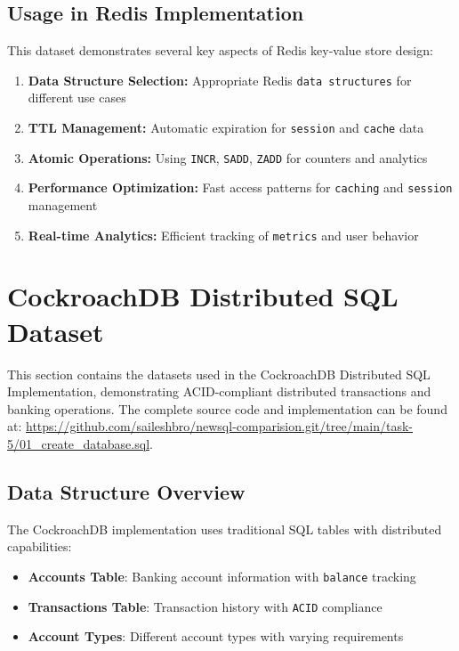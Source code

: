 \subsection{Usage in Redis Implementation}

This dataset demonstrates several key aspects of Redis key-value store design:

\begin{enumerate}
    \item \textbf{Data Structure Selection:} Appropriate Redis \texttt{data structures} for different use cases
    \item \textbf{TTL Management:} Automatic expiration for \texttt{session} and \texttt{cache} data
    \item \textbf{Atomic Operations:} Using \texttt{INCR}, \texttt{SADD}, \texttt{ZADD} for counters and analytics
    \item \textbf{Performance Optimization:} Fast access patterns for \texttt{caching} and \texttt{session} management
    \item \textbf{Real-time Analytics:} Efficient tracking of \texttt{metrics} and user behavior
\end{enumerate}

\section{CockroachDB Distributed SQL Dataset}

This section contains the datasets used in the CockroachDB Distributed SQL Implementation, demonstrating ACID-compliant distributed transactions and banking operations. The complete source code and implementation can be found at: \url{https://github.com/saileshbro/newsql-comparision.git/tree/main/task-5/01_create_database.sql}.

\subsection{Data Structure Overview}

The CockroachDB implementation uses traditional SQL tables with distributed capabilities:
\begin{itemize}
    \item \textbf{Accounts Table}: Banking account information with \texttt{balance} tracking
    \item \textbf{Transactions Table}: Transaction history with \texttt{ACID} compliance
    \item \textbf{Account Types}: Different account types with varying requirements
\end{itemize}

